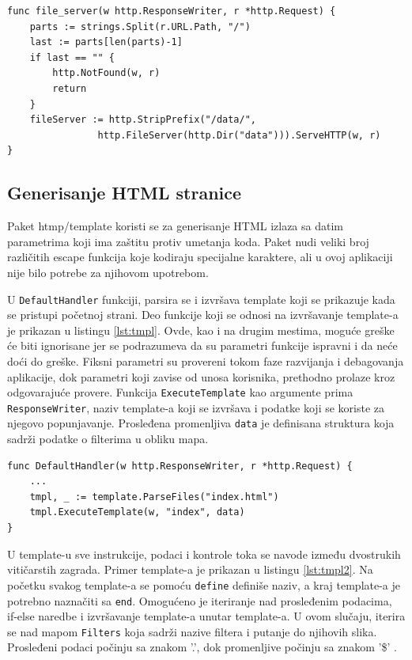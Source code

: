 \documentclass[12pt,oneside]{memoir}
\begin{document}
\begin{center}
\begin{lstlisting}[caption=Handler za fajl sistem,label={lst:fileserver},  backgroundcolor=\color{background}]
func file_server(w http.ResponseWriter, r *http.Request) {
	parts := strings.Split(r.URL.Path, "/")
	last := parts[len(parts)-1]
	if last == "" {
		http.NotFound(w, r)
		return
	}
	fileServer := http.StripPrefix("/data/", 
				http.FileServer(http.Dir("data"))).ServeHTTP(w, r)
}
\end{lstlisting}
\end{center}

\subsection{Generisanje HTML stranice}

Paket htmp/template koristi se za generisanje HTML izlaza sa datim parametrima koji ima zaštitu protiv umetanja koda. Paket nudi veliki broj različitih escape funkcija koje kodiraju specijalne karaktere, ali u ovoj aplikaciji nije bilo potrebe za njihovom upotrebom. 

U \texttt{DefaultHandler} funkciji, parsira se i izvršava template koji se prikazuje kada se pristupi početnoj strani. Deo funkcije koji se odnosi na izvršavanje template-a je prikazan u listingu \ref{lst:tmpl}. Ovde, kao i na drugim mestima, moguće greške će biti ignorisane jer se podrazumeva da su parametri funkcije ispravni i da neće doći do greške. Fiksni parametri su provereni tokom faze razvijanja i debagovanja aplikacije, dok parametri koji zavise od unosa korisnika, prethodno prolaze kroz odgovarajuće provere. Funkcija \texttt{ExecuteTemplate} kao argumente prima \texttt{ResponseWriter}, naziv template-a koji se izvršava i podatke koji se koriste za njegovo popunjavanje. Prosleđena promenljiva \texttt{data} je definisana struktura koja sadrži podatke o filterima u obliku mapa.

\begin{center}
\begin{lstlisting}[caption=Izvršavanje HTML šablona,label={lst:tmpl},  backgroundcolor=\color{background}]
func DefaultHandler(w http.ResponseWriter, r *http.Request) {
	...
	tmpl, _ := template.ParseFiles("index.html")
	tmpl.ExecuteTemplate(w, "index", data)
}
\end{lstlisting}
\end{center}

U template-u sve instrukcije, podaci i kontrole toka se navode između dvostrukih vitičarstih zagrada. Primer template-a je prikazan u listingu \ref{lst:tmpl2}. Na početku svakog template-a se pomoću \texttt{define} definiše naziv, a kraj template-a je potrebno naznačiti sa \texttt{end}. Omogućeno je iteriranje nad prosleđenim podacima, if-else naredbe i izvršavanje template-a unutar template-a. U ovom slučaju, iterira se nad mapom \texttt{Filters} koja sadrži nazive filtera i putanje do njihovih slika. Prosleđeni podaci počinju sa znakom '.', dok promenljive počinju sa znakom '\$' \cite{template}.
\end{document}
